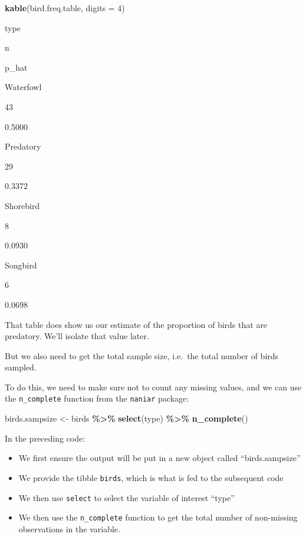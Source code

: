 \documentclass[
]{book}
\newenvironment{Shaded}{\begin{snugshade}}{\end{snugshade}}
\newcommand{\AttributeTok}[1]{\textcolor[rgb]{0.13,0.29,0.53}{#1}}
\newcommand{\DecValTok}[1]{\textcolor[rgb]{0.00,0.00,0.81}{#1}}
\newcommand{\FunctionTok}[1]{\textcolor[rgb]{0.13,0.29,0.53}{\textbf{#1}}}
\newcommand{\NormalTok}[1]{#1}
\newcommand{\OtherTok}[1]{\textcolor[rgb]{0.56,0.35,0.01}{#1}}
\newcommand{\SpecialCharTok}[1]{\textcolor[rgb]{0.81,0.36,0.00}{\textbf{#1}}}
\providecommand{\tightlist}{%
  \setlength{\itemsep}{0pt}\setlength{\parskip}{0pt}}
\begin{document}
\begin{Shaded}
\begin{Highlighting}[]
\FunctionTok{kable}\NormalTok{(bird.freq.table, }\AttributeTok{digits =} \DecValTok{4}\NormalTok{)}
\end{Highlighting}
\end{Shaded}

type

n

p\_hat

Waterfowl

43

0.5000

Predatory

29

0.3372

Shorebird

8

0.0930

Songbird

6

0.0698

That table does show us our estimate of the proportion of birds that are predatory. We'll isolate that value later.

But we also need to get the total sample size, i.e.~the total number of birds sampled.

To do this, we need to make sure not to count any missing values, and we can use the \texttt{n\_complete} function from the \texttt{naniar} package:

\begin{Shaded}
\begin{Highlighting}[]
\NormalTok{birds.sampsize }\OtherTok{\textless{}{-}}\NormalTok{ birds }\SpecialCharTok{\%\textgreater{}\%}
  \FunctionTok{select}\NormalTok{(type) }\SpecialCharTok{\%\textgreater{}\%}
  \FunctionTok{n\_complete}\NormalTok{()}
\end{Highlighting}
\end{Shaded}

In the preceding code:

\begin{itemize}
\tightlist
\item
  We first ensure the output will be put in a new object called ``birds.sampsize''
\item
  We provide the tibble \texttt{birds}, which is what is fed to the subsequent code
\item
  We then use \texttt{select} to select the variable of interest ``type''
\item
  We then use the \texttt{n\_complete} function to get the total number of non-missing observations in the variable.
\end{itemize}
\end{document}
